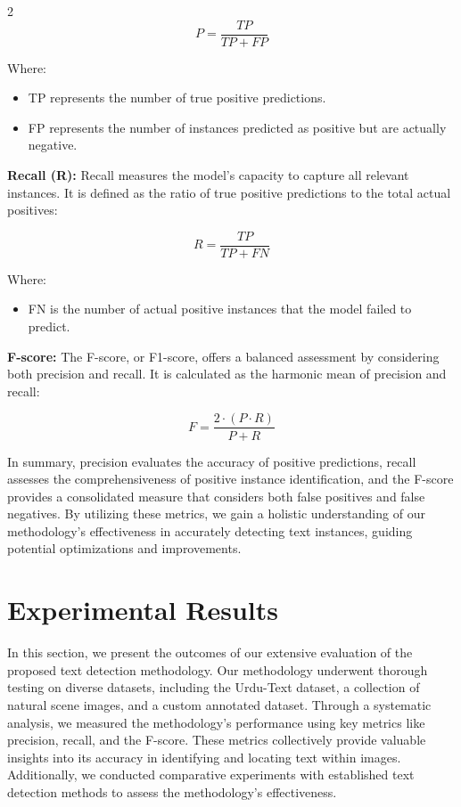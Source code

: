 \documentclass[sn-mathphys,Numbered]{sn-jnl}%
\begin{document}
\begin{multicols}{2}
\begin{equation}
P = \frac{TP}{TP + FP}
\end{equation}

Where: \\
\begin{itemize}
    \item TP represents the number of true positive predictions.
    \item FP represents the number of instances predicted as positive but are actually negative. \\
\end{itemize}

\textbf{Recall (R):} Recall measures the model's capacity to capture all relevant instances. It is defined as the ratio of true positive predictions to the total actual positives:

\begin{equation}
R = \frac{TP}{TP + FN}
\end{equation}

Where: \\
\begin{itemize}
    \item FN is the number of actual positive instances that the model failed to predict. \\
\end{itemize}

\textbf{F-score:} The F-score, or F1-score, offers a balanced assessment by considering both precision and recall. It is calculated as the harmonic mean of precision and recall:

\begin{equation}
F = \frac{2 \cdot (P \cdot R)}{P + R}
\end{equation}

In summary, precision evaluates the accuracy of positive predictions, recall assesses the comprehensiveness of positive instance identification, and the F-score provides a consolidated measure that considers both false positives and false negatives. By utilizing these metrics, we gain a holistic understanding of our methodology's effectiveness in accurately detecting text instances, guiding potential optimizations and improvements.

\section{Experimental Results}
In this section, we present the outcomes of our extensive evaluation of the proposed text detection methodology. Our methodology underwent thorough testing on diverse datasets, including the Urdu-Text dataset, a collection of natural scene images, and a custom annotated dataset. Through a systematic analysis, we measured the methodology's performance using key metrics like precision, recall, and the F-score. These metrics collectively provide valuable insights into its accuracy in identifying and locating text within images. Additionally, we conducted comparative experiments with established text detection methods to assess the methodology's effectiveness.


\end{multicols}
\end{document}
